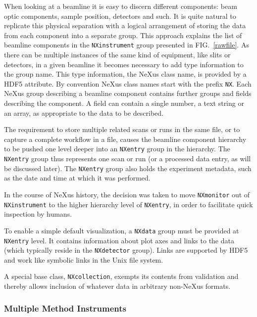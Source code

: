 \documentclass[%
 aip,
rsi,
 amsmath,amssymb,
 reprint,%
]{revtex4-1}
\begin{document}
When looking at a beamline it is easy to 
discern different components: beam optic components, sample position, detectors and such. It is quite natural to replicate this physical 
separation with a logical arrangement of storing the data from each component into a separate group. This approach explains the 
list of beamline components in the \texttt{NXinstrument} group presented in FIG.~\ref{rawfile}. 
As there can be multiple instances of the same kind of equipment, like slits or detectors, in a given beamline it becomes necessary
to add type information to the group name. This type information, the NeXus class name, is provided by a HDF5 attribute.
By convention NeXus class names start 
with the prefix \texttt{NX}. Each NeXus group describing a beamline component contains further groups and fields describing the component. 
A field can contain a single number, a text string or an array, as appropriate to the data to be described.  

The requirement to store multiple related scans or runs in the same file, or to capture 
a complete workflow in a file, causes the beamline component hierarchy to be pushed one level deeper into an \texttt{NXentry} 
group in the hierarchy. The \texttt{NXentry}  group thus represents one scan or run (or a processed data entry, as will be discussed later). 
The \texttt{NXentry} group also holds the experiment metadata, such as the date and time at which it was performed. 

In the course of NeXus history,
the decision was taken to move \texttt{NXmonitor}
out of \texttt{NXinstrument} to the higher hierarchy level of \texttt{NXentry},
in order to facilitate quick inspection by humans.

To enable a simple default visualization,
a \texttt{NXdata} group must be provided at \texttt{NXentry} level.
It contains information about plot axes and links to the data
(which typically reside in the \texttt{NXdetector} group).
Links are supported by HDF5 and work like symbolic links in the Unix file system.

A special base class, \texttt{NXcollection}, exempts its contents from validation
and thereby allows inclusion of whatever data in arbitrary non-NeXus formats.

\subsubsection{Multiple Method Instruments}
\end{document}
